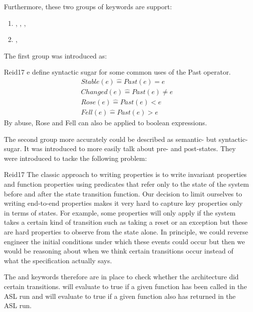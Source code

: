 \documentclass{securem}
\begin{document}
Furthermore, these two groups of keywords are support:
\begin{enumerate}
    \item {}, , , 
    \item {}, 
\end{enumerate}

The first group was introduced as:
\begin{displaycquote}{Reid17}
    e define syntactic sugar for some common uses of the Past operator.
    \begin{align*}
        Stable(e) \widehat{=} Past(e) = e \\
        Changed(e) \widehat{=} Past(e) \neq e \\
        Rose(e) \widehat{=} Past(e) < e \\
        Fell(e) \widehat{=} Past(e) > e
    \end{align*}
    By abuse, Rose and Fell can also be applied to boolean expressions.
\end{displaycquote}

The second group more accurately could be described as semantic- but syntactic-sugar.
It was introduced to more easily talk about pre- and post-states.
They were introduced to tacke the following problem:
\begin{displaycquote}{Reid17}
    The classic approach to writing properties is to write invariant properties and function properties using predicates that refer only to the state of the system before and after the state transition function.
    Our decision to limit ourselves to writing end-to-end properties makes it very hard to capture key properties only in terms of states.
    For example, some properties will only apply if the system takes a certain kind of transition such as taking a reset or an exception but these are hard properties to observe from the state alone.
    In principle, we could reverse engineer the initial conditions under which these events could occur but then we would be reasoning about when we think certain transitions occur instead of what the specification actually says.
\end{displaycquote}

The  and  keywords therefore are in place to check whether the architecture did certain transitions.
 will evaluate to true if a given function has been called in the ASL run and  will evaluate to true if a given function also has returned in the ASL run.
\end{document}

